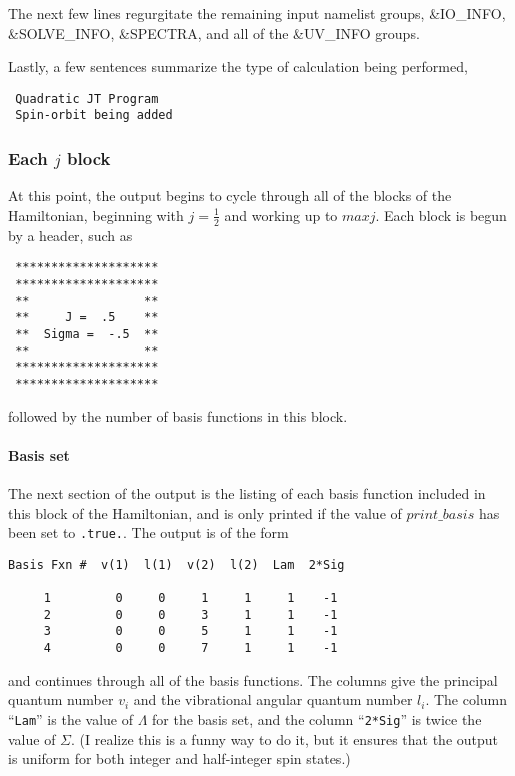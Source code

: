 \documentclass{article}
\begin{document}
The next few lines regurgitate the remaining input namelist groups, 
 \&IO\_INFO, \&SOLVE\_INFO, \&SPECTRA, and all of the \&UV\_INFO
 groups. 

Lastly, a few sentences summarize the type of calculation being
performed,
\begin{verbatim}
 Quadratic JT Program
 Spin-orbit being added
\end{verbatim}

\subsubsection{Each $j$ block}

At this point, the output begins to cycle through all of the blocks of
the Hamiltonian, beginning with $j=\frac12 $ and working up to
$maxj$. Each block is begun by a header, such as
\begin{verbatim}
 ********************
 ********************
 **                **
 **     J =  .5    **
 **  Sigma =  -.5  **
 **                **
 ********************
 ********************
\end{verbatim}
followed by the number of basis functions in this block.

\paragraph{Basis set}
The next section of the output is the listing of each basis function
included in this block of the Hamiltonian, and is only printed if the
value of $print\_basis$ has been set to {\tt .true.}. The output is of
the form
\begin{verbatim}
Basis Fxn #  v(1)  l(1)  v(2)  l(2)  Lam  2*Sig
 
     1         0     0     1     1     1    -1
     2         0     0     3     1     1    -1
     3         0     0     5     1     1    -1
     4         0     0     7     1     1    -1
\end{verbatim}
and continues through all of the basis functions. The columns give the
principal quantum number $v_i$ and the vibrational angular quantum
number $l_i$. The column ``{\tt Lam}'' is the value of $\Lambda $ for
the basis set, and the column ``{\tt 2*Sig}'' is twice the value of
$\Sigma $. (I realize this is a funny way to do it, but it ensures
that the output is uniform for both integer and half-integer spin states.)
\end{document}
